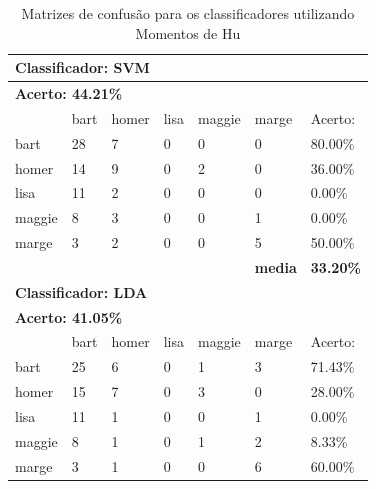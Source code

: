 \documentclass[journal]{IEEEtran}
\begin{document}
\begin{table}[!htb]
\centering
\caption{Matrizes de confusão para os classificadores utilizando Momentos de Hu}
\label{tbl:humoments}
\small
\singlespacing
\begin{tabular}{l|l|l|l|l|l|l} \hline
\multicolumn{7}{l}{\textbf{Classificador: SVM}}                                                \\ \hline
\multicolumn{7}{l}{\textbf{Acerto: 44.21\%}}                                                  \\ \hline
          & bart      & homer     & lisa      & maggie    & marge          & Acerto:            \\ \hline
bart      & 28        & 7         & 0         & 0         & 0              & 80.00\%          \\ \hline
homer     & 14        & 9         & 0         & 2         & 0              & 36.00\%          \\ \hline
lisa      & 11        & 2         & 0         & 0         & 0              & 0.00\%           \\ \hline
maggie    & 8         & 3         & 0         & 0         & 1              & 0.00\%           \\ \hline
marge     & 3         & 2         & 0         & 0         & 5              & 50.00\%          \\ \hline
\textbf{} & \textbf{} & \textbf{} & \textbf{} & \textbf{} & \textbf{media} & \textbf{33.20\%} \\ \hline
\multicolumn{7}{l}{\textbf{Classificador: LDA}}                                                \\ \hline
\multicolumn{7}{l}{\textbf{Acerto: 41.05\%}}                                                  \\ \hline
          & bart      & homer     & lisa      & maggie    & marge          & Acerto:            \\ \hline
bart      & 25        & 6         & 0         & 1         & 3              & 71.43\%          \\ \hline
homer     & 15        & 7         & 0         & 3         & 0              & 28.00\%          \\ \hline
lisa      & 11        & 1         & 0         & 0         & 1              & 0.00\%           \\ \hline
maggie    & 8         & 1         & 0         & 1         & 2              & 8.33\%           \\ \hline
marge     & 3         & 1         & 0         & 0         & 6              & 60.00\%          \\ \hline

\end{tabular}
\end{table}
\end{document}
